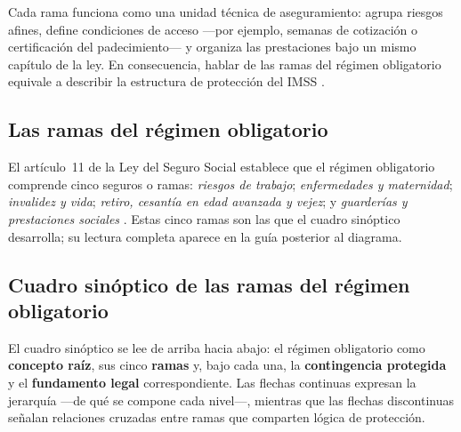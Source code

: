 \documentclass[12pt,letterpaper,oneside]{article}
\begin{document}
Cada rama funciona como una unidad t\'ecnica de aseguramiento: agrupa riesgos afines, define condiciones de acceso ---por ejemplo, semanas de cotizaci\'on o certificaci\'on del padecimiento--- y organiza las prestaciones bajo un mismo cap\'itulo de la ley. En consecuencia, hablar de las ramas del r\'egimen obligatorio equivale a describir la estructura de protecci\'on del IMSS \citep{bricenoRuiz2011,herreraMontes2024}.

\subsection{Las ramas del r\'egimen obligatorio}

El art\'iculo~11 de la Ley del Seguro Social establece que el r\'egimen obligatorio comprende cinco seguros o ramas: \emph{riesgos de trabajo}; \emph{enfermedades y maternidad}; \emph{invalidez y vida}; \emph{retiro, cesant\'ia en edad avanzada y vejez}; y \emph{guarder\'ias y prestaciones sociales} \citep{lss2026}. Estas cinco ramas son las que el cuadro sin\'optico desarrolla; su lectura completa aparece en la gu\'ia posterior al diagrama.

\clearpage
\subsection{Cuadro sin\'optico de las ramas del r\'egimen obligatorio}

El cuadro sin\'optico se lee de arriba hacia abajo: el r\'egimen obligatorio como \textbf{concepto ra\'iz}, sus cinco \textbf{ramas} y, bajo cada una, la \textbf{contingencia protegida} y el \textbf{fundamento legal} correspondiente. Las flechas continuas expresan la jerarqu\'ia ---de qu\'e se compone cada nivel---, mientras que las flechas discontinuas se\~nalan relaciones cruzadas entre ramas que comparten l\'ogica de protecci\'on.
\end{document}

